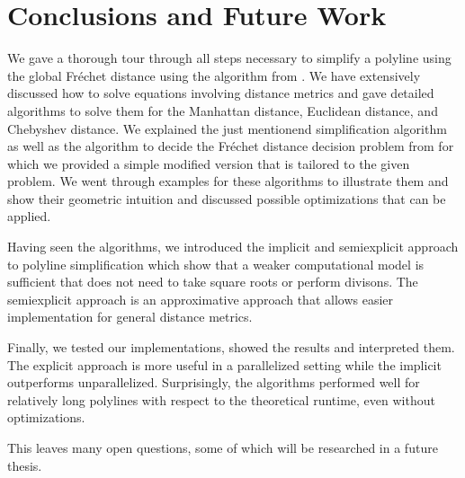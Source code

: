 \section{Conclusions and Future Work}
\label{sec:discussion_conclusion}
We gave a thorough tour through all steps necessary to simplify a polyline using the global Fréchet distance using the algorithm from \citeauthor{on_optimal_polyline_simplification_using_the_hausdorff_and_frechet_distance}. We have extensively discussed how to solve equations involving distance metrics and gave detailed algorithms to solve them for the Manhattan distance, Euclidean distance, and Chebyshev distance. We explained the just mentionend simplification algorithm as well as the algorithm to decide the Fréchet distance decision problem from \citeauthor{computing_the_frechet_distance_between_two_polygonal_curves} for which we provided a simple modified version that is tailored to the given problem. We went through examples for these algorithms to illustrate them and show their geometric intuition and discussed possible optimizations that can be applied. 

Having seen the algorithms, we introduced the implicit and semiexplicit approach to polyline simplification which show that a weaker computational model is sufficient that does not need to take square roots or perform divisons. The semiexplicit approach is an approximative approach that allows easier implementation for general distance metrics. 

Finally, we tested our implementations, showed the results and interpreted them. The explicit approach is more useful in a parallelized setting while the implicit outperforms unparallelized. Surprisingly, the algorithms performed well for relatively long polylines with respect to the theoretical runtime, even without optimizations. 

This leaves many open questions, some of which will be researched in a future thesis. 

